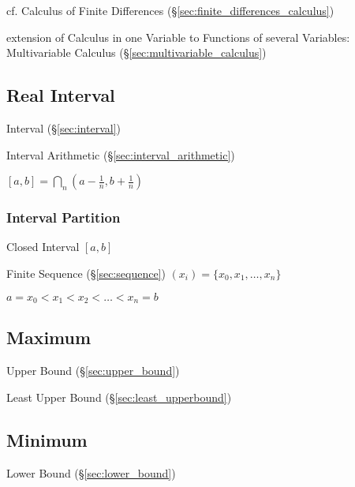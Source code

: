 \fist cf. Calculus of Finite Differences
(\S\ref{sec:finite_differences_calculus})

\fist extension of Calculus in one Variable to Functions of several Variables:
Multivariable Calculus (\S\ref{sec:multivariable_calculus})



\subsection{Real Interval}\label{sec:real_interval}

Interval (\S\ref{sec:interval})

Interval Arithmetic (\S\ref{sec:interval_arithmetic})

$[a,b] = \bigcap_n (a - \frac{1}{n}, b + \frac{1}{n})$



\subsubsection{Interval Partition}\label{sec:interval_partition}

Closed Interval $[a,b]$

Finite Sequence (\S\ref{sec:sequence}) $(x_i) = \{ x_0, x_1, \ldots,
x_n \}$

$a = x_0 < x_1 < x_2 < \ldots < x_n = b$



\subsection{Maximum}\label{sec:maximum}

Upper Bound (\S\ref{sec:upper_bound})

Least Upper Bound (\S\ref{sec:least_upperbound})



\subsection{Minimum}\label{sec:minimum}

Lower Bound (\S\ref{sec:lower_bound})

